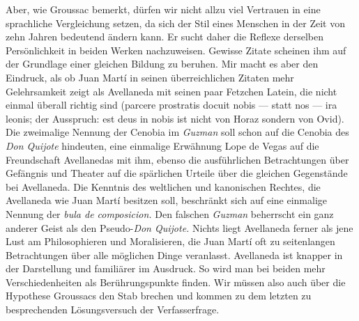 Aber, wie Groussac bemerkt, dürfen wir nicht allzu viel Vertrauen
in eine sprachliche Vergleichung setzen, da sich der Stil eines Menschen
in der Zeit von zehn Jahren bedeutend ändern kann. Er sucht daher
die Reflexe derselben Persönlichkeit in beiden Werken nachzuweisen.
Gewisse Zitate scheinen ihm auf der Grundlage einer gleichen Bildung
zu beruhen. Mir macht es aber den Eindruck, als ob Juan Martí in
seinen überreichlichen Zitaten mehr Gelehrsamkeit zeigt als Avellaneda
mit seinen paar Fetzchen Latein, die nicht einmal überall richtig sind
({\itquoted\latin parcere prostratis docuit nobis --- {\rm statt} nos --- ira leonis};
der Ausspruch: {\itquoted\latin est deus in nobis}
ist nicht von Horaz sondern von Ovid).
Die zweimalige Nennung der Cenobia im {\it Guzman} soll schon auf die
Cenobia des {\it Don Quijote} hindeuten, eine einmalige Erwähnung Lope
de Vegas auf die Freundschaft Avellanedas mit ihm, ebenso die
ausführlichen Betrachtungen über Gefängnis und Theater auf die spärlichen
Urteile über die gleichen Gegenstände bei Avellaneda. Die Kenntnis
des weltlichen und kanonischen Rechtes, die Avellaneda wie Juan Martí
besitzen soll, beschränkt sich auf eine einmalige Nennung der {\it bula de
composicion.} Den falschen {\it Guzman} beherrscht ein ganz anderer Geist
als den Pseudo-{\it Don Quijote.} Nichts liegt Avellaneda ferner als jene
Lust am Philosophieren und Moralisieren, die Juan Martí oft zu
 seitenlangen
Betrachtungen über alle möglichen Dinge veranlasst. Avellaneda
ist knapper in der Darstellung und familiärer im Ausdruck. So wird
man bei beiden mehr Verschiedenheiten als Berührungspunkte finden.
Wir müssen also auch über die Hypothese Groussacs den Stab brechen
und kommen zu dem letzten zu besprechenden Lösungsversuch der Verfasserfrage.

